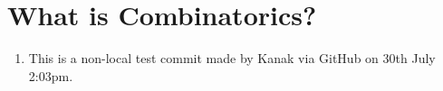 %
%
% 


\chapter{What is Combinatorics?}
\begin{enumerate}
\item This is a non-local test commit made by Kanak via GitHub on 30th July 2:03pm.
\end{enumerate}















\endinput

